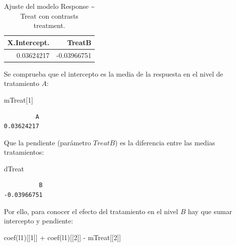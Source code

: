 \documentclass[
  12pt,
  a4paper,
  extrafontsizes,
  onecolumn,
  openright,
  table]{memoir}
\newenvironment{Shaded}{\begin{snugshade}}{\end{snugshade}}
\newcommand{\DecValTok}[1]{\textcolor[rgb]{0.68,0.00,0.00}{#1}}
\newcommand{\FunctionTok}[1]{\textcolor[rgb]{0.28,0.35,0.67}{#1}}
\newcommand{\NormalTok}[1]{\textcolor[rgb]{0.00,0.23,0.31}{#1}}
\newcommand{\SpecialCharTok}[1]{\textcolor[rgb]{0.37,0.37,0.37}{#1}}
\begin{document}
\hypertarget{tbl-l1}{}
\begin{longtable}{rr}
\caption{\label{tbl-l1}Ajuste del modelo Response \textasciitilde{} Treat con contrasts
treatment. }\tabularnewline

\toprule
X.Intercept. & TreatB \\ 
\midrule
0.03624217 & -0.03966751 \\ 
\bottomrule
\end{longtable}

\normalsize

Se comprueba que el intercepto es la media de la respuesta en el nivel
de tratamiento \(A\):

\scriptsize

\begin{Shaded}
\begin{Highlighting}[]
\NormalTok{mTreat[}\DecValTok{1}\NormalTok{]}
\end{Highlighting}
\end{Shaded}

\begin{verbatim}
         A 
0.03624217 
\end{verbatim}

\normalsize

Que la pendiente (parámetro \(TreatB\)) es la diferencia entre las
medias tratamientos:

\scriptsize

\begin{Shaded}
\begin{Highlighting}[]
\NormalTok{dTreat}
\end{Highlighting}
\end{Shaded}

\begin{verbatim}
          B 
-0.03966751 
\end{verbatim}

\normalsize

Por ello, para conocer el efecto del tratamiento en el nivel \(B\) hay
que sumar intercepto y pendiente:

\scriptsize

\begin{Shaded}
\begin{Highlighting}[]
\FunctionTok{coef}\NormalTok{(l1)[[}\DecValTok{1}\NormalTok{]] }\SpecialCharTok{+} \FunctionTok{coef}\NormalTok{(l1)[[}\DecValTok{2}\NormalTok{]] }\SpecialCharTok{{-}}\NormalTok{ mTreat[[}\DecValTok{2}\NormalTok{]]}
\end{Highlighting}
\end{Shaded}
\end{document}
